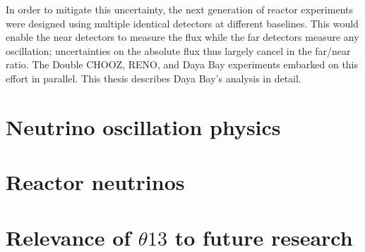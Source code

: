 \documentclass[../thesis.tex]{subfiles}
\begin{document}
In order to mitigate this uncertainty, the next generation of reactor experiments were designed using multiple identical detectors at different baselines. This would enable the near detectors to measure the flux while the far detectors measure any oscillation; uncertainties on the absolute flux thus largely cancel in the far/near ratio. The Double CHOOZ, RENO, and Daya Bay experiments embarked on this effort in parallel. This thesis describes Daya Bay's analysis in detail.

\section{Neutrino oscillation physics}
\label{sec:oscPhysics}

\section{Reactor neutrinos}
\label{sec:introReactor}

\section{Relevance of $\theta13$ to future research}
\label{sec:futureRelevance}
\end{document}
